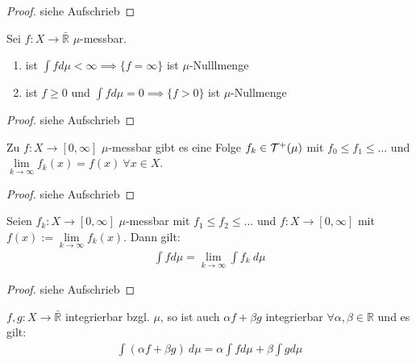   \begin{proof}
    siehe Aufschrieb
  \end{proof}

  \begin{lemma}
    Sei $f: X \to \bar{\mathbb{R}}$ $\mu$-messbar.
    \begin{enumerate}[label=\roman*)]
      \item ist $\int f d\mu < \infty \implies \{f = \infty\}$ ist $\mu$-Nulllmenge
      \item ist $f \geq 0$ und $\int f d\mu = 0 \implies \{f > 0\}$ ist $\mu$-Nullmenge
    \end{enumerate}
  \end{lemma}

  \begin{proof}
    siehe Aufschrieb
  \end{proof}

  \begin{theorem}
    Zu $f: X \to [0,\infty]$ $\mu$-messbar gibt es eine Folge $f_k \in \mathcal{T}^+(\mu)$ mit $f_0 \leq f_1 \leq ...$ und $\lim\limits_{k \to \infty} f_k(x) = f(x) \ \forall x \in X$.
  \end{theorem}

  \begin{proof}
    siehe Aufschrieb
  \end{proof}

  \newpage
  \begin{theorem}
    Seien $f_k:X \to [0,\infty]$ $\mu$-messbar mit $f_1 \leq f_2 \leq ...$ und $f: X \to [0, \infty]$ mit $f(x) := \lim\limits_{k \to \infty} f_k(x)$. Dann gilt:
    \begin{align*}
      \int f d\mu = \lim\limits_{k \to \infty} \int f_k \ d\mu
    \end{align*}
  \end{theorem}

  \begin{proof}
    siehe Aufschrieb
  \end{proof}

  \begin{theorem}
    $f,g: X \to \bar{\mathbb{R}}$ integrierbar bzgl. $\mu$, so ist auch $\alpha f + \beta g$ integrierbar $\forall \alpha, \beta \in \mathbb{R}$ und es gilt:
    \begin{align*}
      \int (\alpha f + \beta g) \ d\mu = \alpha \int f d\mu + \beta \int g d\mu
    \end{align*}
  \end{theorem}

